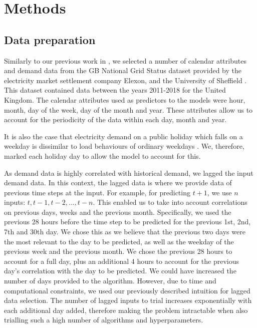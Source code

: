 \documentclass[final,3p,times,twocolumn,numbers]{elsarticle}
\begin{document}
\section{Methods}
\label{sec:methods}


\subsection{Data preparation}

Similarly to our previous work in \cite{Kell2018a}, we selected a number of calendar attributes and demand data from the GB National Grid Status dataset provided by the electricity market settlement company Elexon, and the University of Sheffield \cite{gbnationalgridstatus_2019}. This dataset contained data between the years 2011-2018 for the United Kingdom. The calendar attributes used as predictors to the models were hour, month, day of the week, day of the month and year. These attributes allow us to account for the periodicity of the data within each day, month and year.

It is also the case that electricity demand on a public holiday which falls on a weekday is dissimilar to load behaviours of ordinary weekdays \cite{Kim2000}. We, therefore, marked each holiday day to allow the model to account for this.

As demand data is highly correlated with historical demand, we lagged the input demand data. In this context, the lagged data is where we provide data of previous time steps at the input. For example, for predicting $t+1$, we use $n$ inputs: $t,t-1,t-2,\ldots,t-n$. This enabled us to take into account correlations on previous days, weeks and the previous month. Specifically, we used the previous 28 hours before the time step to be predicted for the previous 1st, 2nd, 7th and 30th day. We chose this as we believe that the previous two days were the most relevant to the day to be predicted, as well as the weekday of the previous week and the previous month. We chose the previous 28 hours to account for a full day, plus an additional 4 hours to account for the previous day's correlation with the day to be predicted. We could have increased the number of days provided to the algorithm. However, due to time and computational constraints, we used our previously described intuition for lagged data selection. The number of lagged inputs to trial increases exponentially with each additional day added, therefore making the problem intractable when also trialling such a high number of algorithms and hyperparameters. 
\end{document}
